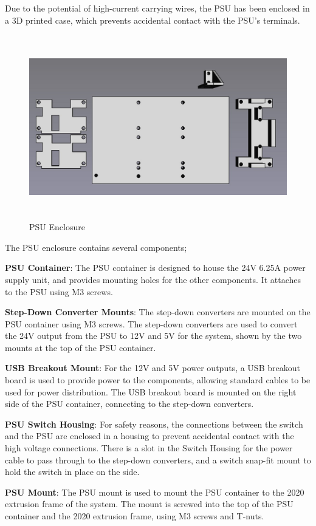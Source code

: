 Due to the potential of high-current carrying wires, the PSU has been enclosed in a 3D printed case, which prevents accidental contact with the PSU's terminals.

\begin{figure}[H]
    \begin{minipage}[h]{0.95\textwidth}
        \centering
        \includegraphics[height=8cm]{imgs/freecad/psu_mount.jpg}
        \caption{PSU Enclosure}
    \end{minipage}
\end{figure}

The PSU enclosure contains several components;
\begin{mylist}
    \item \textbf{PSU Container}: The PSU container is designed to house the 24V 6.25A power supply unit, and provides mounting holes for the other components. It attaches to the PSU using M3 screws.
    \item \textbf{Step-Down Converter Mounts}: The step-down converters are mounted on the PSU container using M3 screws. The step-down converters are used to convert the 24V output from the PSU to 12V and 5V for the system, shown by the two mounts at the top of the PSU container.
    \item \textbf{USB Breakout Mount}: For the 12V and 5V power outputs, a USB breakout board is used to provide power to the components, allowing standard cables to be used for power distribution. The USB breakout board is mounted on the right side of the PSU container, connecting to the step-down converters.
    \item \textbf{PSU Switch Housing}: For safety reasons, the connections between the switch and the PSU are enclosed in a housing to prevent accidental contact with the high voltage connections. There is a slot in the Switch Housing for the power cable to pass through to the step-down converters, and a switch snap-fit mount to hold the switch in place on the side.
    \item \textbf{PSU Mount}: The PSU mount is used to mount the PSU container to the 2020 extrusion frame of the system. The mount is screwed into the top of the PSU container and the 2020 extrusion frame, using M3 screws and T-nuts.
\end{mylist}

